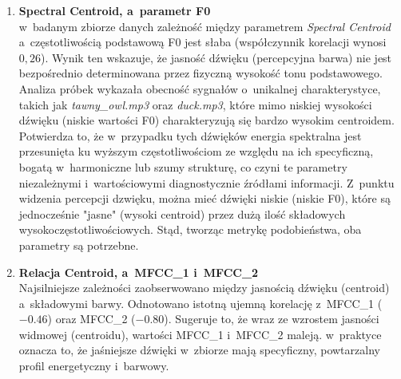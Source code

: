 \documentclass{article}
\begin{document}
\begin{enumerate}[label=\roman*.]
    \item \textbf{Spectral Centroid, a~parametr F0}\\
    w~badanym zbiorze danych zależność między parametrem \textit{Spectral Centroid} a~częstotliwością podstawową F0 jest słaba (współczynnik korelacji wynosi $0{,}26$). Wynik ten wskazuje, że jasność dźwięku (percepcyjna barwa) nie jest bezpośrednio determinowana przez fizyczną wysokość tonu podstawowego. Analiza próbek wykazała obecność sygnałów o~unikalnej charakterystyce, takich jak \textit{tawny\_owl.mp3} oraz \textit{duck.mp3}, które mimo niskiej wysokości dźwięku (niskie wartości F0) charakteryzują się bardzo wysokim centroidem. Potwierdza to, że w~przypadku tych dźwięków energia spektralna jest przesunięta ku wyższym częstotliwościom ze względu na ich specyficzną, bogatą w~harmoniczne lub szumy strukturę, co czyni te parametry niezależnymi i~wartościowymi diagnostycznie źródłami informacji. Z~punktu widzenia percepcji dzwięku,  można mieć dźwięki niskie (niskie F0), które są jednocześnie "jasne" (wysoki centroid) przez dużą ilość składowych wysokoczęstotliwościowych. Stąd, tworząc metrykę podobieństwa, oba parametry są potrzebne.

    \item \textbf{Relacja Centroid, a~MFCC\_1 i~MFCC\_2} \\
    Najsilniejsze zależności zaobserwowano między jasnością dźwięku (centroid) a~składowymi barwy. Odnotowano istotną ujemną korelację z~MFCC\_1 ($-0.46$) oraz MFCC\_2 ($-0.80$). Sugeruje to, że wraz ze wzrostem jasności widmowej (centroidu), wartości MFCC\_1 i~MFCC\_2 maleją. w~praktyce oznacza to, że jaśniejsze dźwięki w~zbiorze mają specyficzny, powtarzalny profil energetyczny i~barwowy.



\end{enumerate}
\end{document}
